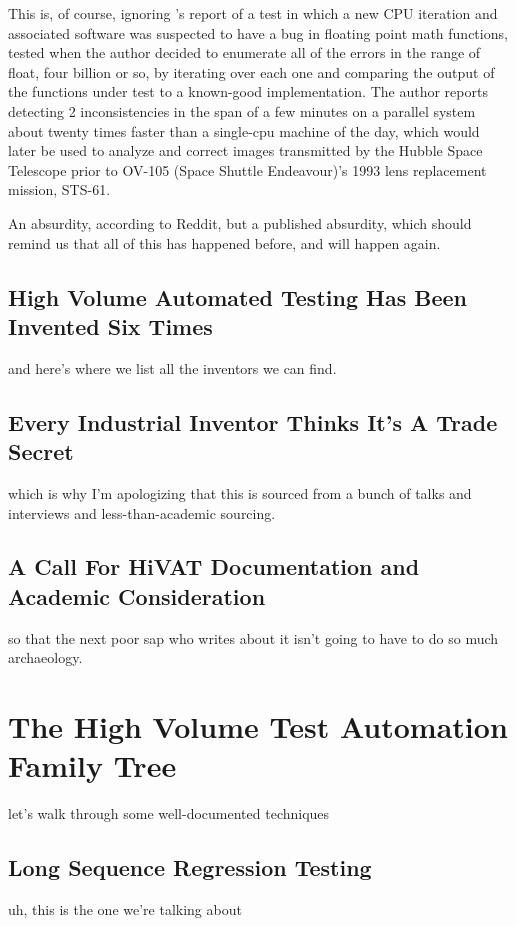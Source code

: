 This is, of course, ignoring \citet{hoffman2003Exhausting}'s report of a test in which a new CPU iteration and associated software was suspected to have a bug in floating point math functions, tested when the author decided to enumerate all of the errors in the range of float, four billion or so, by iterating over each one and comparing the output of the functions under test to a known-good implementation. The author reports detecting 2 inconsistencies in the span of a few minutes on a parallel system about twenty times faster than a single-cpu machine of the day, which would later be used to analyze and correct images transmitted by the Hubble Space Telescope prior to OV-105 (Space Shuttle Endeavour)'s 1993 lens replacement mission, STS-61.

An absurdity, according to Reddit, but a published absurdity, which should remind us that all of this has happened before, and will happen again.

\subsection{High Volume Automated Testing Has Been Invented Six Times}
and here's where we list all the inventors we can find.
\citep{miller1990empirical, KanerHivatOverview} %

\subsection{Every Industrial Inventor Thinks It's A Trade Secret}
which is why I'm apologizing that this is sourced from a bunch of talks and interviews and less-than-academic sourcing. %

\subsection{A Call For HiVAT Documentation and Academic Consideration}
so that the next poor sap who writes about it isn't going to have to do so much archaeology. %

\section{The High Volume Test Automation Family Tree}
let's walk through some well-documented techniques %

\subsection{Long Sequence Regression Testing}
uh, this is the one we're talking about \citep{lee1996principles} %

